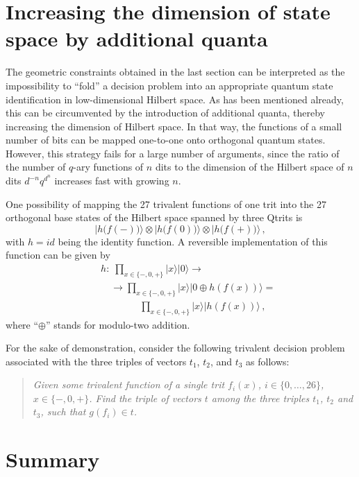 \documentclass{article}
\begin{document}
\section{Increasing the dimension of state space by additional quanta}

The geometric constraints obtained in the last section can be interpreted
as the impossibility to ``fold'' a decision problem
into an appropriate quantum state identification in low-dimensional Hilbert space.
As has been mentioned already, this can be circumvented by the introduction of additional quanta,
thereby increasing the dimension of Hilbert space.
In that way, the functions of a small number of bits can be mapped one-to-one onto orthogonal quantum states.
However, this strategy fails for a large number of arguments, since the ratio
of the number of $q$-ary functions of $n$ dits to the dimension of the Hilbert space of $n$ dits
$d^{-n} q^{d^n}$ increases fast with growing $n$.

One possibility of mapping the 27 trivalent functions of one trit into the 27 orthogonal base states of the Hilbert space spanned by three Qtrits
is
$$|h\bigl(f(-)\bigr)\rangle \otimes
    |h\bigl(f(0)\bigr)\rangle \otimes
    |h\bigl(f(+)\bigr)\rangle\,,$$
with $h= id$ being the identity function.
A reversible implementation of this function can be given by
$$
\begin{array}{lll}
&&h:\; \prod_{x \in \{-,0,+\}} \vert x\rangle |0\rangle  \rightarrow
\\
&&
\quad \rightarrow
\prod_{x \in \{-,0,+\}} \vert x\rangle |0\oplus h(f(x))\rangle =  \\
&&
\qquad \qquad \prod_{x \in \{-,0,+\}} \vert x\rangle |h(f(x))\rangle
\,
,
\end{array}
$$
where ``$\oplus$'' stands for modulo-two addition.

For the sake of demonstration, consider the following trivalent decision problem associated with the three triples of vectors
$t_1$,
$t_2$, and
$t_3$ as follows:
\begin{quote}
{\em
Given some trivalent function of a single trit $f_i (x)$, $i\in \{0,\ldots ,26\}$, $x\in \{-,0,+\}$.
Find the triple of vectors $t$ among the three triples
$t_1$,
$t_2$ and
$t_3$, such that
$g(f_i)\in t$.
}
\end{quote}


\section{Summary}
\end{document}
